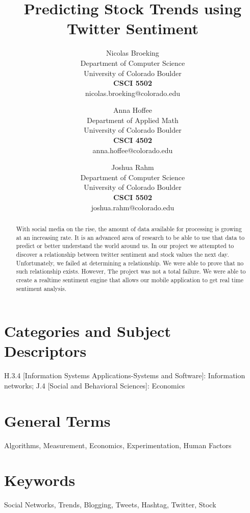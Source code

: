 \documentclass{acm_proc_article-sp}
\title{Predicting Stock Trends using Twitter Sentiment}
\author{
    Nicolas Broeking \\
    \small Department of Computer Science \\
    \small University of Colorado Boulder \\
    \small \textbf{CSCI 5502} \\
    \small nicolas.broeking@colorado.edu \\
    \and
    Anna Hoffee \\
    \small Department of Applied Math \\
    \small University of Colorado Boulder \\
    \small \textbf{CSCI 4502} \\
    \small anna.hoffee@colorado.edu \\
    \and
    Joshua Rahm \\
    \small Department of Computer Science \\
    \small University of Colorado Boulder \\
    \small \textbf{CSCI 5502} \\
    \small joshua.rahm@colorado.edu \\
}
\begin{document}

\maketitle

\begin{abstract} 

With social media on the rise, the amount of data available for processing is
growing at an increasing rate. It is an advanced area of research to be able to
use that data to predict or better understand the world around us. In our
project we attempted to discover a relationship between twitter sentiment and
stock values the next day. Unfortunately, we failed at determining a
relationship. We were able to prove that no such relationship exists. However,
The project was not a total failure. We were able to create a realtime
sentiment engine that allows our mobile application to get real time sentiment
analysis.

\end{abstract}

\section*{Categories and Subject\\ Descriptors}

H.3.4 [Information Systems Applications-Systems and Software]: Information
networks; J.4 [Social and Behavioral Sciences]: Economics

\section*{General Terms}
Algorithms, Measurement, Economics, Experimentation, Human Factors

\section*{Keywords}

Social Networks, Trends, Blogging, Tweets, Hashtag, Twitter, Stock
\end{document}
